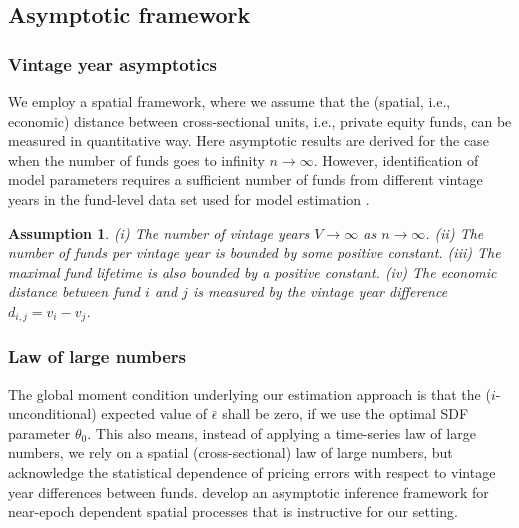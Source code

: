 \documentclass[12pt]{article}
\newtheorem{assume}{Assumption}
\begin{document}
\subsection{Asymptotic framework}
\label{sec:asymptotic_assumptions}

\subsubsection{Vintage year asymptotics}
We employ a spatial framework, where we assume that the (spatial, i.e., economic) distance between cross-sectional units, i.e., private equity funds, can be measured in quantitative way.
Here asymptotic results are derived for the case when the number of funds goes to infinity $n \to \infty$.
However, identification of model parameters requires a sufficient number of funds from different vintage years in the fund-level data set used for model estimation \citep{DLP12,KN16}.
\begin{assume}
	(i) The number of vintage years $V \to \infty$ as $n \to \infty$.
	(ii) The number of funds per vintage year is bounded by some positive constant.
	(iii) The maximal fund lifetime is also bounded by a positive constant.
	(iv) The economic distance between fund $i$ and $j$ is measured by the vintage year difference $d_{i,j}=v_i - v_j$.
\end{assume}

\subsubsection{Law of large numbers}
The global moment condition underlying our estimation approach is that the ($i$-unconditional) expected value of $\bar{\epsilon}$ shall be zero, if we use the optimal SDF parameter $\theta_0$. 
This also means, instead of applying a time-series law of large numbers, we rely on a spatial (cross-sectional) law of large numbers, but acknowledge the statistical dependence of  pricing errors with respect to vintage year differences between funds.
\cite{JP12} develop an asymptotic inference framework for near-epoch dependent spatial processes that is instructive for our setting.
\end{document}

